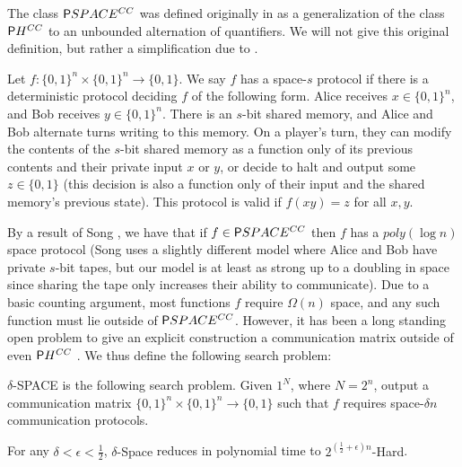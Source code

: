 The class ${\cl PSPACE^{CC}}$ was defined originally in \cite{communication-classes} as a generalization of the class ${\cl PH^{CC}}$ to an unbounded alternation of quantifiers. We will not give this original definition, but rather a simplification due to \cite{space-communication}.

\begin{definition}\label{range:def:space-s-protocol}
Let $f: \{0,1\}^n \times \{0,1\}^n \rightarrow \{0,1\}$. We say $f$ has a space-$s$ protocol if there is a deterministic protocol deciding $f$ of the following form. Alice receives $x \in \{0,1\}^n$, and Bob receives $y \in \{0,1\}^n$. There is an $s$-bit shared memory, and Alice and Bob alternate turns writing to this memory. On a player's turn, they can modify the contents of the $s$-bit shared memory as a function only of its previous contents and their private input $x$ or $y$, or decide to halt and output some $z \in \{0,1\}$ (this decision is also a function only of their input and the shared memory's previous state). This protocol is valid if $f(xy) = z$ for all $x,y$.
\end{definition}


By a result of Song \cite{space-communication}, we have that if $f  \in {\cl PSPACE^{CC}}$ then $f$ has a $poly(\log n)$ space protocol (Song uses a slightly different model where Alice and Bob have private $s$-bit tapes, but our model is at least as strong up to a doubling in space since sharing the tape only increases their ability to communicate). Due to a basic counting argument, most functions $f$ require $\Omega(n)$ space, and any such function must lie outside of $ {\cl PSPACE^{CC}}$. However, it has been a long standing open problem to give an explicit construction a communication matrix outside of even ${\cl PH^{CC}}$ \cite{space-communication}. We thus define the following search problem:

\begin{definition}\label{range:def:delta-space}
{\sc $\delta$-SPACE} is the following search problem. Given $1^N$, where $N=2^n$, output a communication matrix $\{0,1\}^n \times \{0,1\}^n \rightarrow \{0,1\}$ such that $f$ requires space-$\delta n$ communication protocols.
\end{definition}

\begin{theorem}\label{thm:space-circuit}
For any $\delta < \epsilon < \frac{1}{2}$, {\sc $\delta$-Space} reduces in polynomial time to {\sc $2^{(\frac{1}{2} + \epsilon)n}$-Hard}.
\end{theorem}

